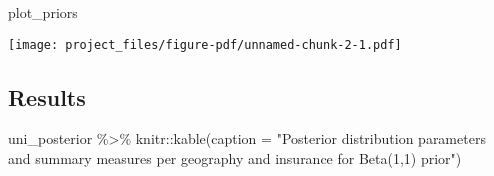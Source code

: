 \documentclass[
  letterpaper,
  DIV=11,
  numbers=noendperiod]{scrartcl}
\newenvironment{Shaded}{\begin{snugshade}}{\end{snugshade}}
\newcommand{\AttributeTok}[1]{\textcolor[rgb]{0.40,0.45,0.13}{#1}}
\newcommand{\FunctionTok}[1]{\textcolor[rgb]{0.28,0.35,0.67}{#1}}
\newcommand{\NormalTok}[1]{\textcolor[rgb]{0.00,0.23,0.31}{#1}}
\newcommand{\SpecialCharTok}[1]{\textcolor[rgb]{0.37,0.37,0.37}{#1}}
\newcommand{\StringTok}[1]{\textcolor[rgb]{0.13,0.47,0.30}{#1}}
\begin{document}
\begin{Shaded}
\begin{Highlighting}[]
\NormalTok{plot\_priors}
\end{Highlighting}
\end{Shaded}

\texttt{[image: project\_files/figure-pdf/unnamed-chunk-2-1.pdf]}

\subsection{Results}\label{results}

\begin{Shaded}
\begin{Highlighting}[]
\NormalTok{uni\_posterior }\SpecialCharTok{\%\textgreater{}\%}\NormalTok{ knitr}\SpecialCharTok{::}\FunctionTok{kable}\NormalTok{(}\AttributeTok{caption =} \StringTok{"Posterior distribution parameters and summary measures per geography and insurance for Beta(1,1) prior"}\NormalTok{)}
\end{Highlighting}
\end{Shaded}
\end{document}
